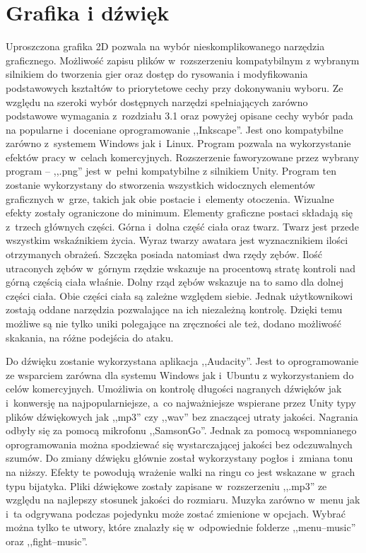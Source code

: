\documentclass[brudnopis]{xmgr}
\begin{document}
\section{Grafika i dźwięk\label{PRZEGLAD.NARZEDZI}}
Uproszczona grafika 2D pozwala na wybór nieskomplikowanego narzędzia
graficznego. Możliwość zapisu plików w~rozszerzeniu kompatybilnym z
wybranym silnikiem do tworzenia gier oraz dostęp do rysowania i
modyfikowania podstawowych kształtów to priorytetowe cechy przy
dokonywaniu wyboru. Ze względu na szeroki wybór dostępnych narzędzi
spełniających zarówno podstawowe wymagania z~rozdziału 3.1 oraz powyżej
opisane cechy wybór pada na popularne i~doceniane oprogramowanie
 ,,Inkscape''. Jest ono kompatybilne zarówno z~systemem Windows jak i~Linux.
Program pozwala na wykorzystanie efektów pracy w~celach komercyjnych.
Rozszerzenie faworyzowane przez wybrany program -- ,,.png'' jest w~pełni
kompatybilne z silnikiem Unity. Program ten zostanie wykorzystany do stworzenia
wszystkich widocznych elementów graficznych w~grze, takich jak obie
postacie i~elementy otoczenia.
Wizualne efekty zostały ograniczone do minimum. Elementy graficzne
postaci składają się z~trzech głównych części. Górna i~dolna część ciała
oraz twarz.
Twarz jest przede wszystkim wskaźnikiem życia. Wyraz twarzy awatara jest wyznacznikiem ilości otrzymanych obrażeń. Szczęka posiada natomiast dwa rzędy zębów. Ilość
utraconych zębów w~górnym
rzędzie wskazuje na procentową stratę kontroli nad  górną częścią
ciała właśnie. Dolny rząd zębów
wskazuje na to samo dla dolnej części ciała.
Obie części ciała są zależne względem siebie. Jednak użytkownikowi zostają
oddane narzędzia
pozwalające na ich niezależną kontrolę. Dzięki temu możliwe są nie tylko
uniki polegające na zręczności
ale też, dodano możliwość skakania, na różne podejścia do ataku.

Do dźwięku zostanie wykorzystana aplikacja ,,Audacity''. Jest to
oprogramowanie ze wsparciem zarówna dla systemu Windows jak i~Ubuntu z
wykorzystaniem do celów komercyjnych. Umożliwia on kontrolę długości
nagranych dźwięków jak i~konwersję na najpopularniejsze, a~co
najważniejsze wspierane przez Unity typy plików dźwiękowych jak ,,mp3'' czy
 ,,wav'' bez znaczącej utraty jakości. Nagrania odbyły się za pomocą mikrofonu
 ,,SamsonGo''. Jednak za pomocą wspomnianego oprogramowania można spodziewać
się wystarczającej jakości bez odczuwalnych szumów.
Do zmiany dźwięku głównie został wykorzystany
pogłos i~zmiana tonu na niższy. Efekty te powodują wrażenie walki na ringu
co jest wskazane w~grach typu
bijatyka. Pliki dźwiękowe zostały zapisane w~rozszerzeniu ,,.mp3'' ze
względu na najlepszy stosunek
jakości do rozmiaru.
Muzyka zarówno w~menu jak i~ta odgrywana podczas pojedynku może zostać
zmienione w
opcjach. Wybrać można tylko te utwory, które znalazły się w~odpowiednie
folderze ,,menu--music'' oraz
,,fight--music''.
\end{document}
